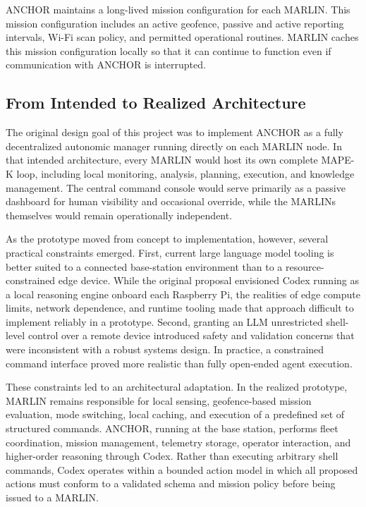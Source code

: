 \documentclass[journal]{IEEEtran}
\begin{document}
ANCHOR maintains a long-lived mission configuration for each MARLIN. This mission configuration includes an active geofence, passive and active reporting intervals, Wi-Fi scan policy, and permitted operational routines. MARLIN caches this mission configuration locally so that it can continue to function even if communication with ANCHOR is interrupted.

\subsection{From Intended to Realized Architecture}
The original design goal of this project was to implement ANCHOR as a fully decentralized autonomic manager running directly on each MARLIN node. In that intended architecture, every MARLIN would host its own complete MAPE-K loop, including local monitoring, analysis, planning, execution, and knowledge management. The central command console would serve primarily as a passive dashboard for human visibility and occasional override, while the MARLINs themselves would remain operationally independent.

As the prototype moved from concept to implementation, however, several practical constraints emerged. First, current large language model tooling is better suited to a connected base-station environment than to a resource-constrained edge device. While the original proposal envisioned Codex running as a local reasoning engine onboard each Raspberry Pi, the realities of edge compute limits, network dependence, and runtime tooling made that approach difficult to implement reliably in a prototype. Second, granting an LLM unrestricted shell-level control over a remote device introduced safety and validation concerns that were inconsistent with a robust systems design. In practice, a constrained command interface proved more realistic than fully open-ended agent execution.

These constraints led to an architectural adaptation. In the realized prototype, MARLIN remains responsible for local sensing, geofence-based mission evaluation, mode switching, local caching, and execution of a predefined set of structured commands. ANCHOR, running at the base station, performs fleet coordination, mission management, telemetry storage, operator interaction, and higher-order reasoning through Codex. Rather than executing arbitrary shell commands, Codex operates within a bounded action model in which all proposed actions must conform to a validated schema and mission policy before being issued to a MARLIN.
\end{document}

